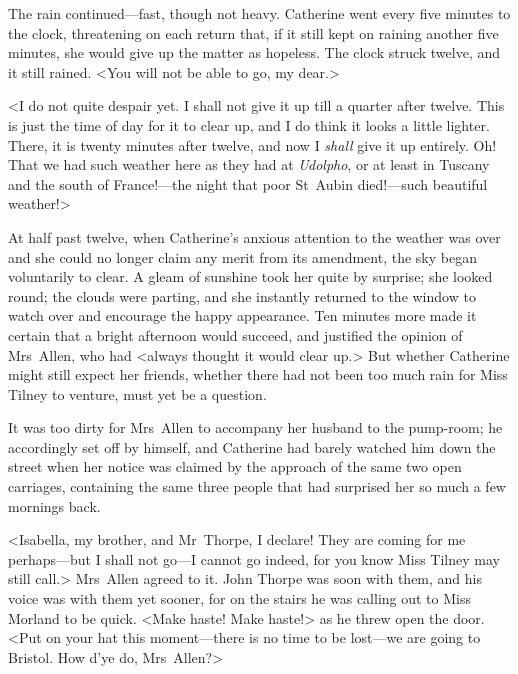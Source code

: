  The rain continued—fast, though not heavy. Catherine went every five minutes to the clock, threatening on each return that, if it still kept on raining another five minutes, she would give up the matter as hopeless. The clock struck twelve, and it still rained. <You will not be able to go, my dear.> 

 <I do not quite despair yet. I shall not give it up till a quarter after twelve. This is just the time of day for it to clear up, and I do think it looks a little lighter. There, it is twenty minutes after twelve, and now I \textit{shall} give it up entirely. Oh! That we had such weather here as they had at \textit{Udolpho}, or at least in Tuscany and the south of France!—the night that poor St~Aubin died!—such beautiful weather!> 

 At half past twelve, when Catherine's anxious attention to the weather was over and she could no longer claim any merit from its amendment, the sky began voluntarily to clear. A gleam of sunshine took her quite by surprise; she looked round; the clouds were parting, and she instantly returned to the window to watch over and encourage the happy appearance. Ten minutes more made it certain that a bright afternoon would succeed, and justified the opinion of Mrs~Allen, who had <always thought it would clear up.> But whether Catherine might still expect her friends, whether there had not been too much rain for Miss Tilney to venture, must yet be a question. 

 It was too dirty for Mrs~Allen to accompany her husband to the pump-room; he accordingly set off by himself, and Catherine had barely watched him down the street when her notice was claimed by the approach of the same two open carriages, containing the same three people that had surprised her so much a few mornings back. 

 <Isabella, my brother, and Mr~Thorpe, I declare! They are coming for me perhaps—but I shall not go—I cannot go indeed, for you know Miss Tilney may still call.> Mrs~Allen agreed to it. John Thorpe was soon with them, and his voice was with them yet sooner, for on the stairs he was calling out to Miss Morland to be quick. <Make haste! Make haste!> as he threw open the door. <Put on your hat this moment—there is no time to be lost—we are going to Bristol. How d'ye do, Mrs~Allen?> 

